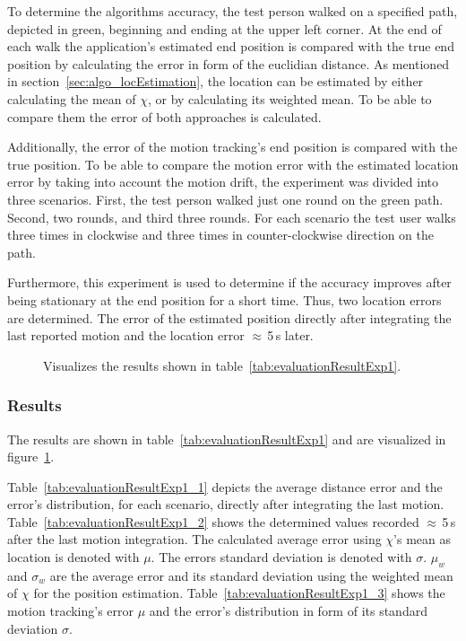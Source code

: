 To determine the algorithms accuracy, the test person walked on a specified path, depicted in green, beginning and ending at the upper left corner. At the end of each walk the application's estimated end position is compared with the true end position by calculating the error in form of the euclidian distance. As mentioned in section~\ref{sec:algo_locEstimation}, the location can be estimated by either calculating the mean of $\chi$, or by calculating its weighted mean. To be able to compare them the error of both approaches is calculated.

Additionally, the error of the motion tracking's end position is compared with the true position. To be able to compare the motion error with the estimated location error by taking into account the motion drift, the experiment was divided into three scenarios. First, the test person walked just one round on the green path. Second, two rounds, and third three rounds. For each scenario the test user walks three times in clockwise and three times in counter-clockwise direction on the path.

Furthermore, this experiment is used to determine if the accuracy improves after being stationary at the end position for a short time. Thus, two location errors are determined. The error of the estimated position directly after integrating the last reported motion and the location error $\approx$\,5\,s later.


\begin{table}
	
	\caption{Depicts the results of experiment~1.}
	\label{tab:evaluationResultExp1}
\end{table}

\begin{figure}
	
	\caption{Visualizes the results shown in table~\ref{tab:evaluationResultExp1}.}
	\label{fig:exp1_visualization}
\end{figure}

\subsubsection*{Results}
The results are shown in table~\ref{tab:evaluationResultExp1} and are visualized in figure~\ref{fig:exp1_visualization}.

Table~\ref{tab:evaluationResultExp1_1} depicts the average distance error and the error's distribution, for each scenario, directly after integrating the last motion. Table~\ref{tab:evaluationResultExp1_2} shows the determined values recorded $\approx$\,5\,s after the last motion integration. The calculated average error using $\chi$'s mean as location is denoted with $\mu$. The errors standard deviation is denoted with $\sigma$. $\mu_w$ and $\sigma_w$ are the average error and its standard deviation using the weighted mean of $\chi$ for the position estimation.
Table~\ref{tab:evaluationResultExp1_3} shows the motion tracking's error $\mu$ and the error's distribution in form of its standard deviation $\sigma$.

